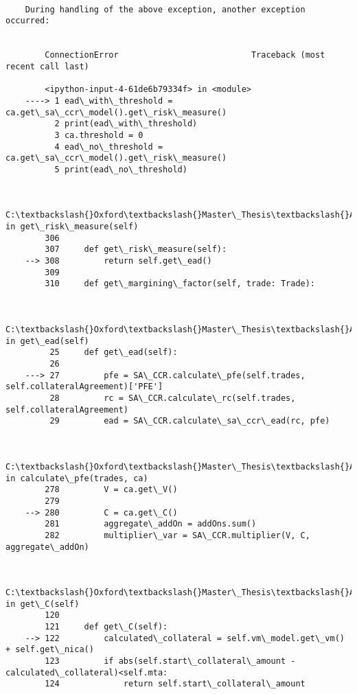 \begin{Verbatim}[commandchars=\\\{\}]
        
    During handling of the above exception, another exception occurred:
    

        ConnectionError                           Traceback (most recent call last)

        <ipython-input-4-61de6b79334f> in <module>
    ----> 1 ead\_with\_threshold = ca.get\_sa\_ccr\_model().get\_risk\_measure()
          2 print(ead\_with\_threshold)
          3 ca.threshold = 0
          4 ead\_no\_threshold = ca.get\_sa\_ccr\_model().get\_risk\_measure()
          5 print(ead\_no\_threshold)
    

        C:\textbackslash{}Oxford\textbackslash{}Master\_Thesis\textbackslash{}Allocation\_Thesis\textbackslash{}SA\_CCR\_Allocation\textbackslash{}src\textbackslash{}sa\_ccr\textbackslash{}sa\_ccr.py in get\_risk\_measure(self)
        306 
        307     def get\_risk\_measure(self):
    --> 308         return self.get\_ead()
        309 
        310     def get\_margining\_factor(self, trade: Trade):
    

        C:\textbackslash{}Oxford\textbackslash{}Master\_Thesis\textbackslash{}Allocation\_Thesis\textbackslash{}SA\_CCR\_Allocation\textbackslash{}src\textbackslash{}sa\_ccr\textbackslash{}sa\_ccr.py in get\_ead(self)
         25     def get\_ead(self):
         26 
    ---> 27         pfe = SA\_CCR.calculate\_pfe(self.trades, self.collateralAgreement)['PFE']
         28         rc = SA\_CCR.calculate\_rc(self.trades, self.collateralAgreement)
         29         ead = SA\_CCR.calculate\_sa\_ccr\_ead(rc, pfe)
    

        C:\textbackslash{}Oxford\textbackslash{}Master\_Thesis\textbackslash{}Allocation\_Thesis\textbackslash{}SA\_CCR\_Allocation\textbackslash{}src\textbackslash{}sa\_ccr\textbackslash{}sa\_ccr.py in calculate\_pfe(trades, ca)
        278         V = ca.get\_V()
        279 
    --> 280         C = ca.get\_C()
        281         aggregate\_addOn = addOns.sum()
        282         multiplier\_var = SA\_CCR.multiplier(V, C, aggregate\_addOn)
    

        C:\textbackslash{}Oxford\textbackslash{}Master\_Thesis\textbackslash{}Allocation\_Thesis\textbackslash{}SA\_CCR\_Allocation\textbackslash{}src\textbackslash{}collateralAgreement\textbackslash{}collateralAgreement.py in get\_C(self)
        120 
        121     def get\_C(self):
    --> 122         calculated\_collateral = self.vm\_model.get\_vm() + self.get\_nica()
        123         if abs(self.start\_collateral\_amount - calculated\_collateral)<self.mta:
        124             return self.start\_collateral\_amount
    


\end{Verbatim}
